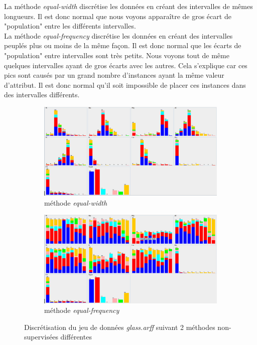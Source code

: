\documentclass[10pt,a4paper]{article}
\begin{document}
			La méthode \textit{equal-width} discrétise les données en créant des intervalles de mêmes longueurs. Il est donc normal que nous voyons apparaître de gros écart de "population" entre les différents intervalles.\\
			
			La méthode \textit{equal-frequency} discrétise les données en créant des intervalles peuplés plus ou moins de la même façon. Il est donc normal que les écarts  de "population" entre intervalles sont très petits. Nous voyons tout de même quelques intervalles ayant de gros écarts avec les autres. Cela s'explique car ces pics sont causés par un grand nombre d'instances ayant la même valeur d'attribut. Il est donc normal qu'il soit impossible de placer ces instances dans des intervalles différents.
			
			\begin{figure}[h]
				\centering
				\begin{subfigure}{.5\textwidth}
					\centering
					\includegraphics[width=.9\textwidth]{glass_disc_width}
					\caption{méthode \textit{equal-width}}
				\end{subfigure}%
				\begin{subfigure}{.5\textwidth}
					\centering
					\includegraphics[width=.9\textwidth]{glass_disc_freq}
					\caption{méthode \textit{equal-frequency}}
				\end{subfigure}
				
				\caption{Discrétisation du jeu de données \textit{glass.arff} suivant 2 méthodes non-supervisées différentes}
				\label{fig:glass:disc}
			\end{figure}
			
\end{document}
